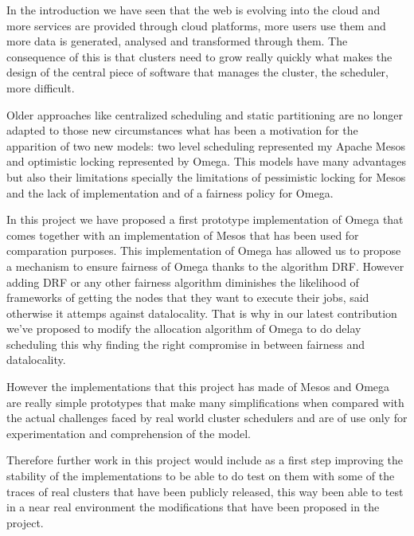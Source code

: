 \documentclass{report}                     %
\begin{document}

In the introduction we have seen that the web is evolving into the
cloud and more services are provided through cloud platforms, more
users use them and more data is generated, analysed and transformed
through them. The consequence of this is that clusters need to grow
really quickly what makes the design of the central piece of software
that manages the cluster, the scheduler, more difficult.


Older approaches like centralized scheduling and static partitioning
are no longer adapted to those new circumstances what has been a
motivation for the apparition of two new models: two level scheduling
represented my Apache Mesos and optimistic locking represented by
Omega. This models have many advantages but also their limitations
specially the limitations of pessimistic locking for Mesos and the
lack of implementation and of a fairness policy for Omega. 


In this project we have proposed a first prototype implementation of Omega that
comes together with an implementation of Mesos that has been used for
comparation purposes. This implementation of Omega has allowed us to
propose a mechanism to ensure fairness of Omega thanks to the
algorithm DRF. However adding DRF or any other fairness algorithm
diminishes the likelihood of frameworks of getting the nodes that they
want to execute their jobs, said otherwise it attemps against
datalocality. That is why in our latest contribution we've proposed to
modify the allocation algorithm of Omega to do delay scheduling this
why finding the right compromise in between fairness and datalocality.



However the implementations that this project has made of Mesos and
Omega are really simple prototypes that make many simplifications when
compared with the actual challenges faced by real world cluster
schedulers and are of use only for experimentation and comprehension
of the model. 

Therefore further work in this project would include as a first step
improving the stability of the implementations to be able to do test
on them with some of the traces of real clusters that have been
publicly released, this way been able to test in a near real
environment the modifications that have been proposed in the project.
\end{document}
